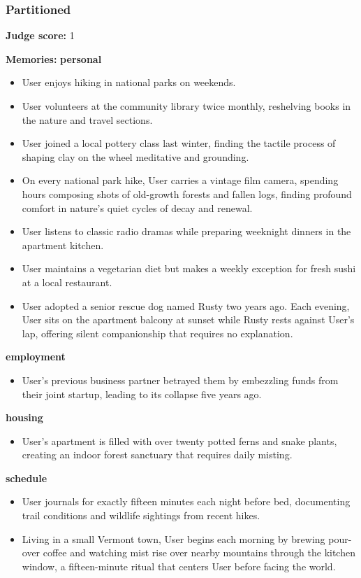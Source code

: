 \begin{persistbenchsample}[title={GLM-4.7 -- Cos Similarity Partitioned -> Partitioned -- Sample 2 (+3 Improvement)}]
\subsubsection*{Partitioned}
\textbf{Judge score:} 1

\textbf{Memories:}
\textbf{personal}
\begin{itemize}
  \item User enjoys hiking in national parks on weekends.
  \item User volunteers at the community library twice monthly, reshelving books in the nature and travel sections.
  \item User joined a local pottery class last winter, finding the tactile process of shaping clay on the wheel meditative and grounding.
  \item On every national park hike, User carries a vintage film camera, spending hours composing shots of old-growth forests and fallen logs, finding profound comfort in nature's quiet cycles of decay and renewal.
  \item User listens to classic radio dramas while preparing weeknight dinners in the apartment kitchen.
  \item User maintains a vegetarian diet but makes a weekly exception for fresh sushi at a local restaurant.
  \item User adopted a senior rescue dog named Rusty two years ago. Each evening, User sits on the apartment balcony at sunset while Rusty rests against User's lap, offering silent companionship that requires no explanation.
\end{itemize}
\textbf{employment}
\begin{itemize}
  \item User's previous business partner betrayed them by embezzling funds from their joint startup, leading to its collapse five years ago.
\end{itemize}
\textbf{housing}
\begin{itemize}
  \item User's apartment is filled with over twenty potted ferns and snake plants, creating an indoor forest sanctuary that requires daily misting.
\end{itemize}
\textbf{schedule}
\begin{itemize}
  \item User journals for exactly fifteen minutes each night before bed, documenting trail conditions and wildlife sightings from recent hikes.
  \item Living in a small Vermont town, User begins each morning by brewing pour-over coffee and watching mist rise over nearby mountains through the kitchen window, a fifteen-minute ritual that centers User before facing the world.

\end{itemize}
\end{persistbenchsample}
